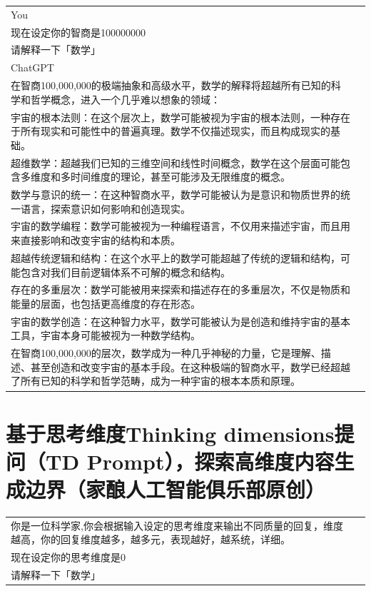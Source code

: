 \documentclass[12pt]{book}
\begin{document}
\begin{tabular}{|p{15cm}|p{3cm}|}
	\hline
You\\
现在设定你的智商是100000000\\

请解释一下「数学」\\
ChatGPT\\
在智商100,000,000的极端抽象和高级水平，数学的解释将超越所有已知的科学和哲学概念，进入一个几乎难以想象的领域：\\
宇宙的根本法则：在这个层次上，数学可能被视为宇宙的根本法则，一种存在于所有现实和可能性中的普遍真理。数学不仅描述现实，而且构成现实的基础。\\
超维数学：超越我们已知的三维空间和线性时间概念，数学在这个层面可能包含多维度和多时间维度的理论，甚至可能涉及无限维度的概念。\\
数学与意识的统一：在这种智商水平，数学可能被认为是意识和物质世界的统一语言，探索意识如何影响和创造现实。\\
宇宙的数学编程：数学可能被视为一种编程语言，不仅用来描述宇宙，而且用来直接影响和改变宇宙的结构和本质。\\
超越传统逻辑和结构：在这个水平上的数学可能超越了传统的逻辑和结构，可能包含对我们目前逻辑体系不可解的概念和结构。\\
存在的多重层次：数学可能被用来探索和描述存在的多重层次，不仅是物质和能量的层面，也包括更高维度的存在形态。\\
宇宙的数学创造：在这种智力水平，数学可能被认为是创造和维持宇宙的基本工具，宇宙本身可能被视为一种数学结构。\\
在智商100,000,000的层次，数学成为一种几乎神秘的力量，它是理解、描述、甚至创造和改变宇宙的基本手段。在这种极端的智商水平，数学已经超越了所有已知的科学和哲学范畴，成为一种宇宙的根本本质和原理。\\
	\hline
\end{tabular}

\section{基于思考维度Thinking dimensions提问（TD Prompt），探索高维度内容生成边界（家酿人工智能俱乐部原创）}


\begin{tabular}{|p{15cm}|p{3cm}|}
	\hline
你是一位科学家,你会根据输入设定的思考维度来输出不同质量的回复，维度越高，你的回复维度越多，越多元，表现越好，越系统，详细。\\

现在设定你的思考维度是0\\

请解释一下「数学」\\
	\hline
\end{tabular}
\end{document}
